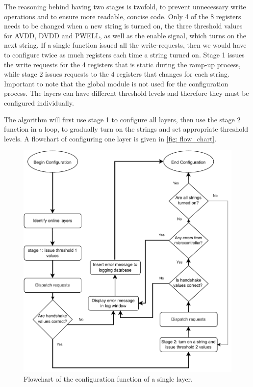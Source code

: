 \documentclass[main.tex]{subfiles}
\begin{document}
The reasoning behind having two stages is twofold, to prevent unnecessary write operations and to ensure more readable, concise code. Only 4 of the 8 registers needs to be changed when a new string is turned on, the three threshold values for AVDD, DVDD and PWELL, as well as the enable signal, which turns on the next string. If a single function issued all the write-requests, then we would have to configure twice as much registers each time a string turned on. Stage 1 issues the write requests for the 4 registers that is static during the ramp-up process, while stage 2 issues requests to the 4 registers that changes for each string. Important to note that the global module is not used for the configuration process. The layers can have different threshold levels and therefore they must be configured individually.

The algorithm will first use stage 1 to configure all layers, then use the stage 2 function in a loop, to gradually turn on the strings and set appropriate threshold levels. A flowchart of configuring one layer is given in \autoref{fig: flow_chart}.

\begin{figure}[!ht]
    \centering
    \includegraphics[width=12cm, scale=1.5]{images/Configuration Flowchart.pdf}
    \caption{Flowchart of the configuration function of a single layer.}
    \label{fig: flow_chart}
\end{figure}
\FloatBarrier
\end{document}
